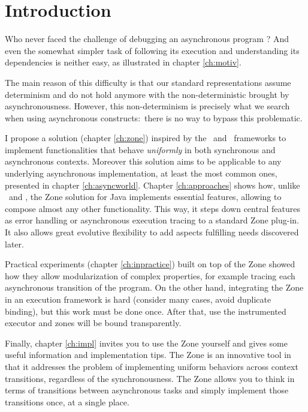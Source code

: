 
\chapter{Introduction}
\label{ch:intro}

Who never faced the challenge of debugging an asynchronous program ? And even the somewhat simpler task of following its execution and understanding its dependencies is neither easy, as illustrated in chapter \ref{ch:motiv}.

The main reason of this difficulty is that our standard representations assume determinism and do not hold anymore with the non-deterministic brought by asynchronousness.
However, this non-determinism is precisely what we search when using asynchronous constructs:~there is no way to bypass this problematic.

I propose a solution (chapter \ref{ch:zone}) inspired by the \zonejs\ and \zonedrt\ frameworks to implement functionalities that behave \emph{uniformly} in both synchronous and asynchronous contexts. Moreover this solution aims to be applicable to any underlying asynchronous implementation, at least the most common ones, presented in chapter \ref{ch:asyncworld}. Chapter \ref{ch:approaches} shows how, unlike \zonejs\ and \zonedrt, the Zone solution for Java implements essential features, allowing to compose almost any other functionality. This way, it steps down central features as error handling or asynchronous execution tracing to a standard Zone plug-in. It also allows great evolutive flexibility to add aspects fulfilling needs discovered later.

Practical experiments (chapter \ref{ch:inpractice}) built on top of the Zone showed how they allow modularization of complex properties, for example tracing each asynchronous transition of the program. On the other hand, integrating the Zone in an execution framework is hard (consider many cases, avoid duplicate binding), but this work must be done once. After that, use the instrumented executor and zones will be bound transparently.

Finally, chapter \ref{ch:impl} invites you to use the Zone yourself and gives some useful information and implementation tips. The Zone is an innovative tool in that it addresses the problem of implementing uniform behaviors across context transitions, regardless of the synchronousness. The Zone allows you to think in terms of transitions between asynchronous tasks and simply implement those transitions once, at a single place.









